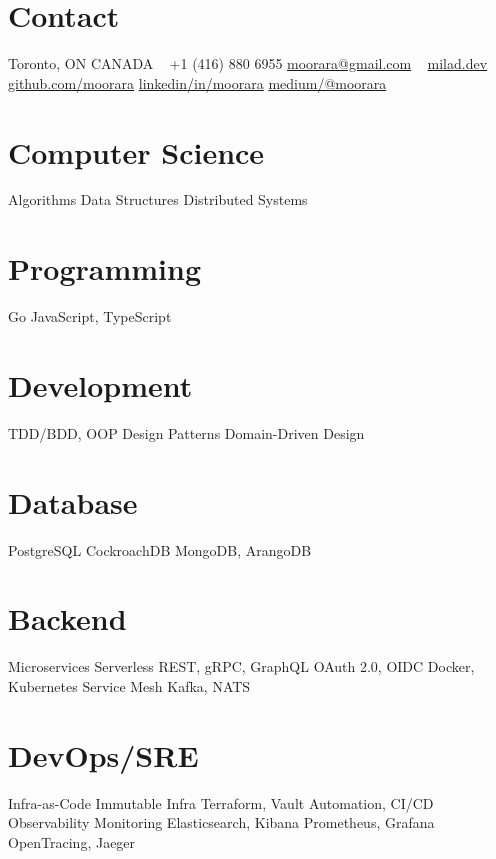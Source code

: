 \documentclass[]{cv-style}                     %
\begin{document}
\lastupdated



\begin{aside}
%
\section{Contact}
Toronto, ON  CANADA
~
+1 (416) 880 6955
\href{mailto:moorara@gmail.com}{moorara@gmail.com}
~
\href{https://milad.dev}{milad.dev}
\href{https://github.com/moorara}{github.com/moorara}
\href{https://linkedin.com/in/moorara}{linkedin/in/moorara}
\href{https://medium.com/@moorara}{medium/@moorara}
%
\section{Computer Science}
Algorithms
Data Structures
Distributed Systems
%
\section{Programming}
Go
JavaScript, TypeScript
%
\section{Development}
TDD/BDD, OOP
Design Patterns
Domain-Driven Design
%
\section{Database}
PostgreSQL
CockroachDB
MongoDB, ArangoDB
%
\section{Backend}
Microservices
Serverless
REST, gRPC, GraphQL
OAuth 2.0, OIDC
Docker, Kubernetes
Service Mesh
Kafka, NATS
%
%
\section{DevOps/SRE}
Infra-as-Code
Immutable Infra
Terraform, Vault
Automation, CI/CD
Observability
Monitoring
Elasticsearch, Kibana
Prometheus, Grafana
OpenTracing, Jaeger
%

\end{aside}
\end{document}
